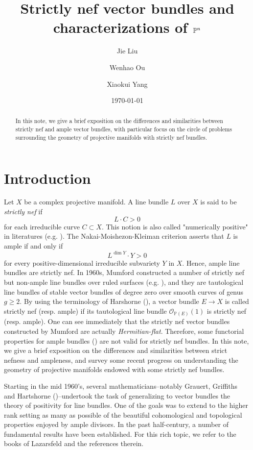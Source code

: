 \documentclass[english,reqno]{amsart}
\title{Strictly nef vector bundles and characterizations of $\bbP^n$}
\date{\today}
\author{Jie Liu}
\author{Wenhao Ou}
\author{Xiaokui Yang}
\newcommand\bbP{{\mathbb P}}
\newcommand\sO{{\mathscr O}}
\theoremstyle{plain}
\theoremstyle{definition}
\numberwithin{equation}{section} %
\begin{document}
\begin{abstract}  In this note, we give a brief exposition on the differences and similarities between strictly nef and ample vector bundles, with particular focus on the circle of  problems surrounding the geometry of projective manifolds  with strictly nef bundles.
\end{abstract}


\maketitle

\tableofcontents

\vspace{-0.2cm}

\section{Introduction}



Let $X$ be a complex projective manifold. A line bundle $L$ over $X$ is said to be \emph{strictly nef} if   $$L\cdot
C>0$$ for each irreducible curve $C\subset X$.  This notion is also called "numerically positive" in literatures (e.g. \cite{Hartshorne1970}).  The Nakai-Moishezon-Kleiman criterion asserts that  $L$ is ample if and only if
$$ L^{\dim Y}\cdot Y>0 $$ for every positive-dimensional irreducible subvariety $Y$ in $X$.  Hence, ample line bundles are strictly nef. In 1960s, Mumford constructed a number of  strictly nef but non-ample line bundles over  ruled surfaces (e.g. \cite{Hartshorne1970}), and they are  tautological line bundles of stable vector bundles of degree zero over smooth curves of genus $g\geq 2$. By using the terminology of Harshorne (\cite{Hartshorne1966}), a vector bundle $E\rightarrow X$ is called strictly nef (resp. ample) if its tautological line bundle $\sO_{\bbP(E)}(1)$ is strictly nef (resp. ample). One can see immediately that the strictly nef vector bundles constructed by Mumford are actually \emph{Hermitian-flat}. Therefore, some functorial properties for ample bundles (\cite{Hartshorne1966}) are not valid for strictly nef bundles. In this note, we give a brief exposition on the differences and similarities between strict nefness and ampleness, and survey some recent progress on understanding the geometry of projective manifolds endowed with some strictly nef bundles.

Starting in the mid 1960’s, several mathematicians--notably Grauert, Griffiths  and Hartshorne (\cite{Grauert1962, Griffiths1965, Griffiths1969,Hartshorne1966})--undertook the task
of generalizing to vector bundles the theory of positivity for line bundles. One
of the goals was to extend to the higher rank setting as many as possible of the
beautiful cohomological and topological properties enjoyed by ample divisors. In the past  half-century, a number of  fundamental results have been established. For this rich topic,  we refer to the books \cite{Lazarsfeld2004,Lazarsfeld2004a} of Lazarsfeld and the references therein.
\end{document}
